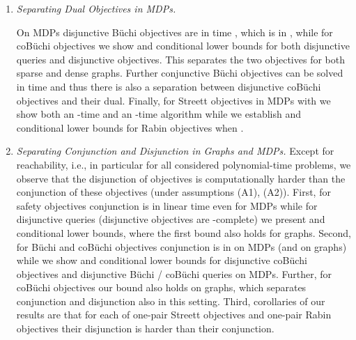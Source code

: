 \documentclass[11pt,letterpaper]{article}
\newif\iffullversion
\newcommand{\infull}[1]{\iffullversion #1\fi}
\newcommand{\inshort}[1]{\iffullversion \else #1\fi}
\begin{document}
\begin{enumerate}
\begin{enumerate}
\item
\emph{Separating Dual Objectives in MDPs.}	
		\infull{First, consider Büchi and coBüchi objectives in MDPs.}
		On MDPs disjunctive Büchi objectives are in time , which is in 
		, while for coBüchi objectives
		we show  and  conditional lower bounds for 
		both disjunctive queries and disjunctive objectives. This separates the 
		two objectives for both sparse and dense graphs.
		Further conjunctive Büchi objectives can be solved in 
		time and thus there is also a separation between disjunctive coBüchi
		objectives and their dual.
		Finally, for Streett objectives in MDPs with  
		we show both an -time and an -time algorithm while 
		we establish  and 
		 conditional lower bounds for Rabin objectives
		when .
		
\item
\emph{Separating Conjunction and Disjunction in Graphs and MDPs.}
		Except for reachability, i.e., in particular for all considered 
		polynomial-time problems, we observe that the disjunction of objectives is
		computationally harder than the conjunction of these objectives (under assumptions (A1), (A2)).
		First, for safety objectives conjunction is in linear time even for MDPs
		while for disjunctive queries (disjunctive objectives are -complete)
		we present  and  conditional lower bounds, where the 
		first bound also holds for graphs.
		Second, for Büchi and coBüchi objectives conjunction is in  on MDPs
		(and  on graphs) while 
		we show  and  conditional lower bounds for 
		disjunctive coBüchi objectives and disjunctive Büchi / coBüchi queries on MDPs.
		\infull{The  bound even holds for the disjunction of singleton coBüchi
		objectives. }Further, for coBüchi objectives our  bound also holds on graphs,
		which separates conjunction and disjunction also in this setting.
		Third, \infull{we can also see the results for Streett and Rabin objectives 
		as a separation between conjunction and disjunction. Recall that Streett 
		objectives are the conjunction of one-pair Streett objectives and 
		Rabin objectives are the disjunction of one-pair Rabin objectives.
		Further, both Büchi and coBüchi objectives are special cases of each of 
		one-pair Streett and one-pair Rabin objectives. In particular the following
		separations are easy observations or corollaries of our results:
		For the disjunction of one-pair Streett objectives the same conditional 
		lower bounds (and the same upper bound, see Observation~\ref{obs:disjStreett}) as 
		for the disjunction of coBüchi objectives apply.
		Thus the disjunction of one-pair Streett objectives is harder than the 
		conjunction of one-pair Streett objectives (under assumptions (A1)/(A2)).
		The conjunction of one-pair Rabin objectives can be solved in the same time 
		as conjunctive Büchi objectives. Thus also the disjunction of one-pair 
		Rabin objectives is harder than their conjunction.}
		\inshort{corollaries of our results are that
		for each of one-pair Streett objectives and one-pair Rabin objectives their
		disjunction is harder than their conjunction.}
	\end{enumerate}
\end{enumerate}
\end{document}
